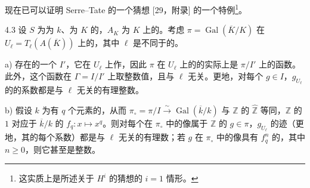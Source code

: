 现在已可以证明 Serre--Tate 的一个猜想 [29，附录] 的一个特例\footnote{这实质上是所述关于 $H^i$ 的猜想的 $i=1$ 情形。}。
\begin{SGAresult}{}{4.3}
设 $S$ 为为 $k$、为 $K$ 的，$A_K$ 为 $K$ 上的。考虑 $\pi=\operatorname{Gal}(\overline K/K)$ 在 $U_\ell=T_\ell(A(\overline K))$ 上的，其中 $\ell$ 是不同于的。

 a) 存在的一个 $I'$，它在 $U_\ell$ 上作，因此 $\pi$ 在 $U_\ell$ 上的的实际上是 $\pi/I'$ 上的函数。此外，这个函数在 $\Gamma=I/I'$ 上取整数值，且与 $\ell$ 无关。更地，对每个 $g\in I$，$g_{U_\ell}$ 的的系数都是与 $\ell$ 无关的有理整数。

 b) 假设 $k$ 为有 $q$ 个元素的，从而 $\pi_\circ=\pi/I\xrightarrow{\sim}\operatorname{Gal}(\overline k/k)$ 与 $\mathbb Z$ 的 $\widehat{\mathbb Z}$ 等同，$\mathbb Z$ 的 $1$ 对应于 $\overline k/k$ 的 $f_q:x\mapsto x^q$。则对每个在 $\pi_\circ$ 中的像属于 $\mathbb Z$ 的 $g\in\pi$，$g_{U_\ell}$ 的迹（更地，其的每个系数）都是与 $\ell$ 无关的有理数；若 $g$ 在 $\pi_\circ$ 中的像具有 $f_q^n$ 的，其中 $n\geq0$，则它甚至是整数。
\end{SGAresult}
